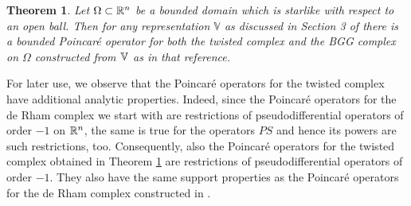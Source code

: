 \documentclass[11pt]{amsart}
\newtheorem{theorem}{Theorem}
\newcommand{\0}{\mathaccent23}
\begin{document}
\begin{theorem}\label{thm:bounded-poincare}
Let $\Omega\subset\Bbb R^n$ be a bounded domain which is starlike with respect to an open ball. Then for any representation $\mathbb V$ as discussed in Section 3 of \cite{vcap2022bgg} there is a bounded Poincar\'e operator for both the twisted complex and the BGG complex on $\Omega$ constructed from $\Bbb V$ as in that reference.   
\end{theorem}

For later use, we observe that the Poincar\'e operators for the twisted complex have additional analytic properties. Indeed, since the Poincar\'e operators for the de Rham complex we start with are restrictions of pseudodifferential operators of order $-1$ on $\Bbb R^n$, the same is true for the operators $PS$ and hence its powers are such restrictions, too. Consequently, also the Poincar\'e operators for the twisted complex obtained in Theorem \ref{thm:bounded-poincare} are restrictions of pseudodifferential operators of order $-1$. They also have the same support properties as the Poincar\'e operators for the de Rham complex constructed in \cite{costabel2010bogovskiui}. 
\end{document}
